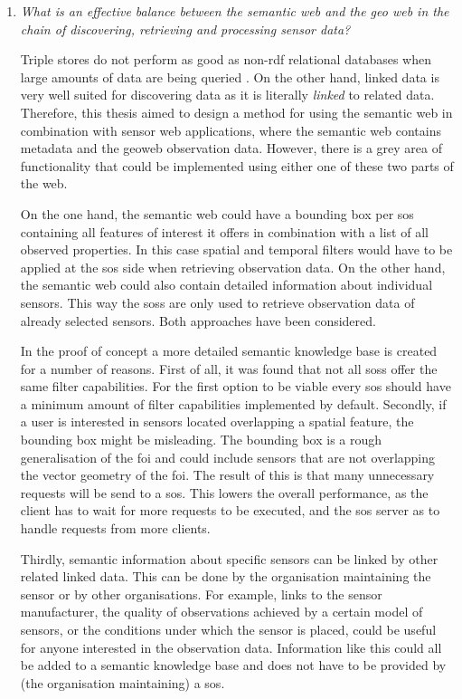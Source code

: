 \begin{enumerate}
\item \textit{What is an effective balance between the semantic web and the geo web in the chain of discovering, retrieving and processing sensor data?}%

Triple stores do not perform as good as non-\ac{rdf} relational databases when large amounts of data are being queried \citep{LD:Bizer2}. On the other hand, linked data is very well suited for discovering data as it is literally \textit{linked} to related data. Therefore, this thesis aimed to design a method for using the semantic web in combination with sensor web applications, where the semantic web contains metadata and the geoweb observation data. However, there is a grey area of functionality that could be implemented using either one of these two parts of the web. 

On the one hand, the semantic web could have a bounding box per \ac{sos} containing all features of interest it offers in combination with a list of all observed properties. In this case spatial and temporal filters would have to be applied at the \ac{sos} side when retrieving observation data. On the other hand, the semantic web could also contain detailed information about individual sensors. This way the \aclp{sos} are only used to retrieve observation data of already selected sensors. Both approaches have been considered.

In the proof of concept a more detailed semantic knowledge base is created for a number of reasons. First of all, it was found that not all \aclp{sos} offer the same filter capabilities. For the first option to be viable every \ac{sos} should have a minimum amount of filter capabilities implemented by default. 
Secondly, if a user is interested in sensors located overlapping a spatial feature, the bounding box might be misleading. The bounding box is a rough generalisation of the \ac{foi} and could include sensors that are not overlapping the vector geometry of the \ac{foi}. The result of this is that many unnecessary requests will be send to a \ac{sos}. This lowers the overall performance, as the client has to wait for more requests to be executed, and the \ac{sos} server as to handle requests from more clients. 

Thirdly, semantic information about specific sensors can be linked by other related linked data. This can be done by the organisation maintaining the sensor or by other organisations. For example, links to the sensor manufacturer, the quality of observations achieved by a certain model of sensors, or the conditions under which the sensor is placed, could be useful for anyone interested in the observation data. Information like this could all be added to a semantic knowledge base and does not have to be provided by (the organisation maintaining) a \ac{sos}.


\end{enumerate}
